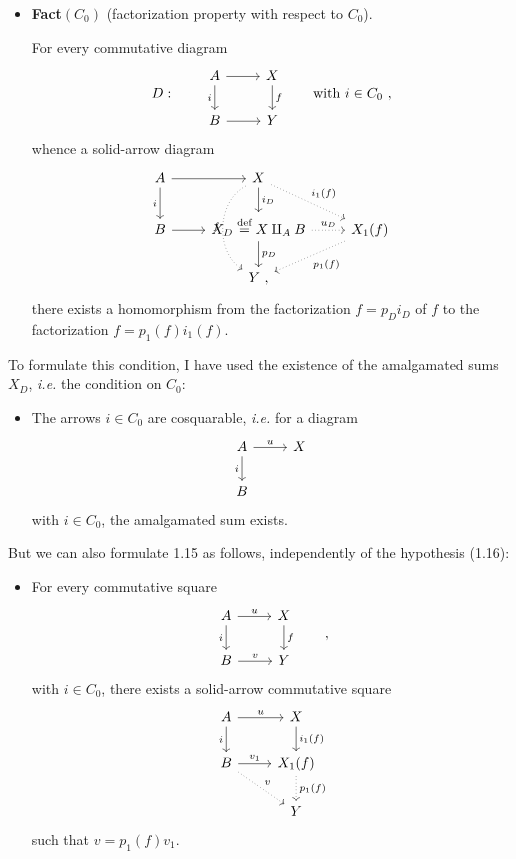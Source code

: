 \begin{itemize}[leftmargin=5em, labelwidth=4em, labelsep=1em, align=left]
\item[(1.15)] \textbf{Fact}$(C_0)$ (factorization property with respect to $C_0$).

For every commutative diagram
\[
D : \qquad
\begin{tikzcd}
A \arrow[r] \arrow[d, "i"'] & X \arrow[d, "f"] \\
B \arrow[r] & Y
\end{tikzcd}
\qquad \text{with } i \in C_0 \ ,
\]
whence a solid-arrow diagram
\[
\begin{tikzcd}
A \arrow[r] \arrow[d, "i"'] & X \arrow[d, "i_D"] \arrow[dr, dotted, "i_1(f)"] \arrow[dd, dotted, bend right=60, "f"'] & \\
B \arrow[r] & X_D \overset{\text{def}}{=} X \amalg_A B \arrow[r, dotted, "u_D"] \arrow[d, "p_D"] & X_1(f) \arrow[dl, dotted, "p_1(f)"] \\
 & Y \ , &
\end{tikzcd}
\]
there exists a homomorphism from the factorization $f = p_D i_D$ of $f$ to the factorization $f = p_1(f)i_1(f)$.
\end{itemize}

To formulate this condition, I have used the existence of the amalgamated sums $X_D$, \textit{i.e.} the condition on $C_0$:


\begin{itemize}[leftmargin=5em, labelwidth=4em, labelsep=1em, align=left]
\item[(1.16)] The arrows $i \in C_0$ are cosquarable, \textit{i.e.} for a diagram
\[
\begin{tikzcd}
A \arrow[r, "u"] \arrow[d, "i"'] & X \\
B &
\end{tikzcd}
\]
with $i \in C_0$, the amalgamated sum exists.
\end{itemize}

But we can also formulate 1.15 as follows, independently of the hypothesis (1.16):

\begin{itemize}[leftmargin=5em, labelwidth=4em, labelsep=1em, align=left]
\item[(1.17)] For every commutative square
\[
\begin{tikzcd}
A \arrow[r, "u"] \arrow[d, "i"'] & X \arrow[d, "f"] \\
B \arrow[r, "v"] & Y
\end{tikzcd}
\qquad ,
\]
with $i \in C_0$, there exists a solid-arrow commutative square
\[
\begin{tikzcd}
A \arrow[r, "u"] \arrow[d, "i"'] & X \arrow[d, "i_1(f)"] \\
B \arrow[r, "v_1"] \arrow[dr, dotted, "v"] & X_1(f) \arrow[d, dotted, "p_1(f)"] \\
 & Y
\end{tikzcd}
\]
such that $v = p_1(f)v_1$.
\end{itemize}

